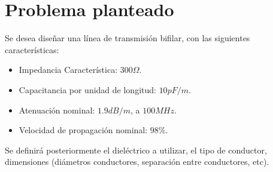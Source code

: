 \section{Problema planteado}
Se desea diseñar una línea de transmisión bifilar, con las siguientes características:

\begin{itemize}
    \item Impedancia Característica: $300 \Omega$.
    \item Capacitancia por unidad de longitud: $10 pF/m$.
    \item Atenuación nominal: $1.9 dB/m$, a $100MHz$.
    \item Velocidad de propagación nominal: $98\%$.
\end{itemize}

Se definirá posteriormente el dieléctrico a utilizar, el tipo de conductor, dimensiones (diámetros
conductores, separación entre conductores, etc).

\pagebreak